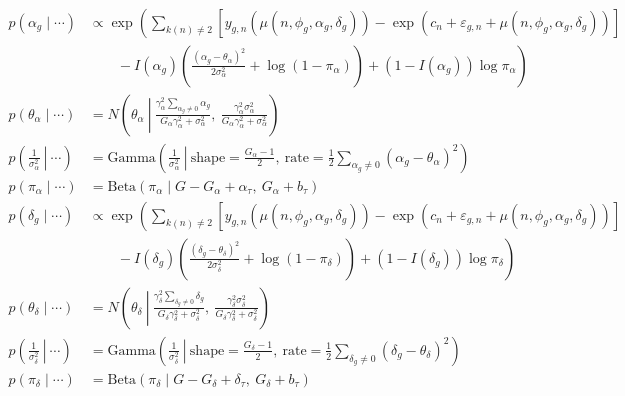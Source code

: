 \documentclass{article}\usepackage{graphicx, color}
\providecommand{\e}{\varepsilon}
\begin{document}
\begin{flushleft}
\begin{align*}
\end{align*}
\begin{align*}
p(\alpha_g \mid \cdots) &\propto \exp \left ( \sum_{k(n) \ne 2} \left [ y_{g, n} (\mu(n, \phi_g, \alpha_g, \delta_g)) - \exp(c_n + \e_{g, n} + \mu(n, \phi_g, \alpha_g, \delta_g)) \right ] \right . \\
&\left .  \qquad - I(\alpha_g) \left ( \frac{(\alpha_g - \theta_\alpha)^2}{2 \sigma_\alpha^2} + \log( 1 - \pi_\alpha) \right ) + (1 - I(\alpha_g)) \log \pi_\alpha  \right ) \\
p(\theta_\alpha \mid \cdots) &= N \left (\theta_\alpha \ \left \lvert \ \frac{\gamma_\alpha^2 \sum_{\alpha_g \ne 0} \alpha_g}{G_\alpha \gamma_\alpha^2 + \sigma_\alpha^2} \right ., \ \frac{\gamma_\alpha^2 \sigma_\alpha^2}{G_\alpha \gamma_\alpha^2 + \sigma_\alpha^2} \right ) \\
p \left ( \left . \frac{1}{\sigma_\alpha^2}  \ \right \rvert \ \cdots \right ) &= \text{Gamma} \left ( \left . \frac{1}{\sigma_\alpha^2} \ \right \rvert  \ \text{shape} = \frac{G_\alpha - 1}{2}, \ \text{rate} = \frac{1}{2} \sum_{\alpha_g \ne 0} (\alpha_g - \theta_\alpha)^2 \right ) \\
p(\pi_\alpha \mid \cdots) &= \text{Beta}(\pi_\alpha \mid G - G_\alpha + \alpha_\tau, \ G_\alpha + b_\tau) \\
p(\delta_g \mid \cdots) &\propto  \exp \left ( \sum_{k(n) \ne 2} \left [ y_{g, n} (\mu(n, \phi_g, \alpha_g, \delta_g)) - \exp(c_n + \e_{g, n} + \mu(n, \phi_g, \alpha_g, \delta_g)) \right ] \right . \\
&\left .  \qquad - I(\delta_g) \left ( \frac{(\delta_g - \theta_\delta)^2}{2 \sigma_\delta^2} + \log( 1 - \pi_\delta) \right ) + (1 - I(\delta_g)) \log \pi_\delta  \right ) \\
p(\theta_\delta \mid \cdots) &= N \left ( \theta_\delta \ \left \lvert \ \frac{\gamma_\delta^2 \sum_{\delta_g \ne 0} \delta_g}{G_\delta \gamma_\delta^2 + \sigma_\delta^2} \right . , \ \frac{\gamma_\delta^2 \sigma_\delta^2}{G_\delta \gamma_\delta^2 + \sigma_\delta^2} \right ) \\
p \left ( \left . \frac{1}{\sigma_\delta^2}  \ \right \rvert \ \cdots \right ) &= \text{Gamma} \left ( \left . \frac{1}{\sigma_\delta^2} \ \right \rvert \ \text{shape} = \frac{G_\delta - 1}{2}, \ \text{rate} = \frac{1}{2} \sum_{\delta_g \ne 0} (\delta_g - \theta_\delta)^2 \right ) \\
p(\pi_\delta \mid \cdots) &= \text{Beta}(\pi_\delta \mid G - G_\delta + \delta_\tau, \ G_\delta + b_\tau)
\end{align*}




\end{flushleft}
\end{document}
